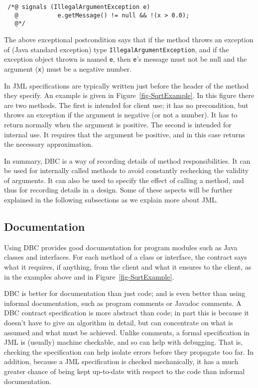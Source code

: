 \documentclass{jotarticle}
\begin{document}
\begin{verbatim}
 /*@ signals (IllegalArgumentException e)
   @           e.getMessage() != null && !(x > 0.0);
   @*/
\end{verbatim}

The above exceptional postcondition says that if the method throws an
exception of (Java standard exception) type \texttt{IllegalArgumentException},
and if the
exception object thrown is named \texttt{e}, then \texttt{e}'s message
must not be null and the argument (\texttt{x}) must be a negative number.

In JML specifications are typically written just before the header
of the method they specify.  An example is given in
Figure~\ref{fig-SqrtExample}.  In this figure there are two methods.
The first is intended for client use; it has no precondition, but
throws an exception if the argument is negative (or not a number).
It has to return normally when the argument is positive.
The second is intended for internal use.  It requires that the
argument be positive, and in this case returns the necessary approximation.

\begin{figure*}

\caption{The file SqrtExample.java}
\label{fig-SqrtExample}
\end{figure*}

In summary, DBC is a way of recording details of method
responsibilities. It can be used for internally called methods to 
avoid constantly rechecking the validity of arguments.
It can also be used to specify the effect of calling a method, and
thus for recording details in a design.
Some of these aspects will be further explained in the following
subsections as we explain more about JML.

\subsection{Documentation}

Using DBC provides good documentation for program modules such as Java
classes and interfaces. For each method of a class or interface, the contract
says what it requires, if anything, from the client and what it
ensures to the client, as in the examples above and in
Figure~\ref{fig-SqrtExample}. 

DBC is better for documentation than just code;
and is even better than using informal documentation, such as program
comments or Javadoc comments.
A DBC contract specification is more abstract than code; in part this
is because it doesn't have to give an algorithm in detail, but can
concentrate on what is assumed and what must be achieved.
Unlike comments, a formal specification in JML is (usually)
machine checkable, and so can help with debugging.
That is, checking the specification can help isolate errors before
they propagate too far.
In addition, because a JML specification is checked mechanically, it
has a much greater chance of being kept up-to-date with respect to the
code than informal documentation.
\end{document}
